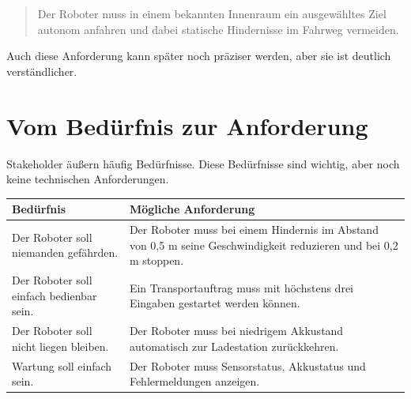 \begin{quote}
Der Roboter muss in einem bekannten Innenraum ein ausgewähltes Ziel autonom anfahren und dabei statische Hindernisse im Fahrweg vermeiden.
\end{quote}

Auch diese Anforderung kann später noch präziser werden, aber sie ist deutlich verständlicher.

\section{Vom Bedürfnis zur Anforderung}
Stakeholder äußern häufig Bedürfnisse. Diese Bedürfnisse sind wichtig, aber noch keine technischen Anforderungen.

\begin{center}
\begin{tabular}{p{}p{}}
\toprule
\textbf{Bedürfnis} & \textbf{Mögliche Anforderung} \\
\midrule
Der Roboter soll niemanden gefährden. & Der Roboter muss bei einem Hindernis im Abstand von 0,5 m seine Geschwindigkeit reduzieren und bei 0,2 m stoppen. \\
Der Roboter soll einfach bedienbar sein. & Ein Transportauftrag muss mit höchstens drei Eingaben gestartet werden können. \\
Der Roboter soll nicht liegen bleiben. & Der Roboter muss bei niedrigem Akkustand automatisch zur Ladestation zurückkehren. \\
Wartung soll einfach sein. & Der Roboter muss Sensorstatus, Akkustatus und Fehlermeldungen anzeigen. \\
\bottomrule
\end{tabular}
\end{center}

